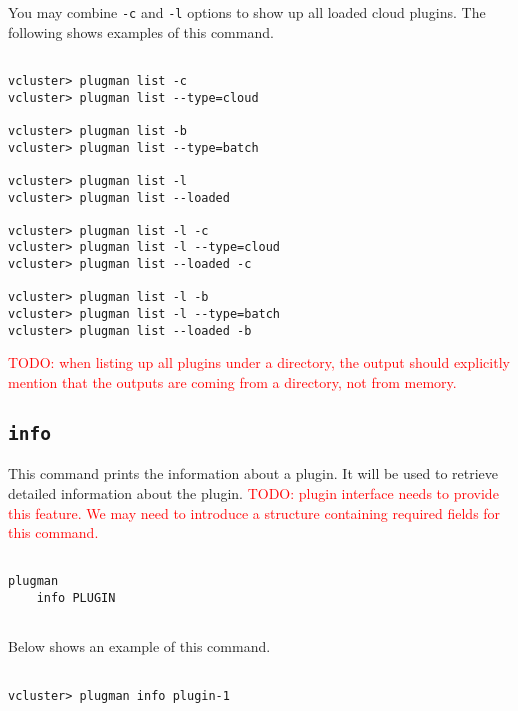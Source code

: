\documentclass[11pt]{article}
\def \ttt{\texttt}
\def \vb{\verb}
\begin{document}
You may combine \vb+-c+ and \vb+-l+ options to show up all loaded cloud plugins. The following shows examples of this command.

\begin{Verbatim}[fontfamily=courier, fontsize = \small, obeytabs
=true, tabsize=4, frame=lines]

vcluster> plugman list -c
vcluster> plugman list --type=cloud

vcluster> plugman list -b
vcluster> plugman list --type=batch

vcluster> plugman list -l
vcluster> plugman list --loaded

vcluster> plugman list -l -c
vcluster> plugman list -l --type=cloud
vcluster> plugman list --loaded -c

vcluster> plugman list -l -b
vcluster> plugman list -l --type=batch
vcluster> plugman list --loaded -b

\end{Verbatim}

\textcolor{red}{TODO: when listing up all plugins under a directory, the output should explicitly mention that the outputs are coming from a directory, not from memory.}


\subsection{\ttt{info}}
This command prints the information about a plugin. It will be used to retrieve detailed information about the plugin. \textcolor{red}{TODO: plugin interface needs to provide this feature. We may need to introduce a structure containing required fields for this command.}

\begin{Verbatim}[fontfamily=courier, fontsize = \small, obeytabs
=true, tabsize=4, frame=lines]

plugman 
    info PLUGIN
      
\end{Verbatim}

Below shows an example of this command.

\begin{Verbatim}[fontfamily=courier, fontsize = \small, obeytabs
=true, tabsize=4, frame=lines]

vcluster> plugman info plugin-1
      
\end{Verbatim}



\newpage
\end{document}

